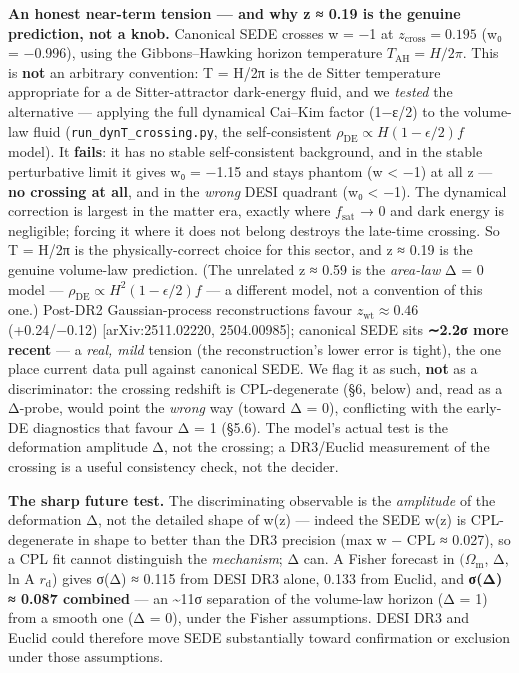 \documentclass[
  10pt,
]{article}
\begin{document}
\textbf{An honest near-term tension --- and why z ≈ 0.19 is the genuine
prediction, not a knob.} Canonical SEDE crosses w = −1 at
\textbf{\(z_{\mathrm{cross}} = 0.195\)} (w₀ = −0.996), using the
Gibbons--Hawking horizon temperature \(T_{\mathrm{AH}} = H/2\pi\). This
is \textbf{not} an arbitrary convention: T = H/2π is the de Sitter
temperature appropriate for a de Sitter-attractor dark-energy fluid, and
we \emph{tested} the alternative --- applying the full dynamical
Cai--Kim factor (1−ε/2) to the volume-law fluid
(\texttt{run\_dynT\_crossing.py}, the self-consistent
\(\rho _{\mathrm{DE}} \propto  H(1-\epsilon /2)f\) model). It
\textbf{fails}: it has no stable self-consistent background, and in the
stable perturbative limit it gives w₀ = −1.15 and stays phantom (w
\textless{} −1) at all z --- \textbf{no crossing at all}, and in the
\emph{wrong} DESI quadrant (w₀ \textless{} −1). The dynamical correction
is largest in the matter era, exactly where \(f_{\mathrm{sat}}\) → 0 and
dark energy is negligible; forcing it where it does not belong destroys
the late-time crossing. So T = H/2π is the physically-correct choice for
this sector, and z ≈ 0.19 is the genuine volume-law prediction. (The
unrelated z ≈ 0.59 is the \emph{area-law} Δ = 0 model ---
\(\rho _{\mathrm{DE}} \propto  H^{2}(1-\epsilon /2)f\) --- a different
model, not a convention of this one.) Post-DR2 Gaussian-process
reconstructions favour \(z_{\mathrm{wt}} \approx  0.46\) (+0.24/−0.12)
{[}arXiv:2511.02220, 2504.00985{]}; canonical SEDE sits \textbf{∼2.2σ
more recent} --- a \emph{real, mild} tension (the reconstruction's lower
error is tight), the one place current data pull against canonical SEDE.
We flag it as such, \textbf{not} as a discriminator: the crossing
redshift is CPL-degenerate (§6, below) and, read as a Δ-probe, would
point the \emph{wrong} way (toward Δ = 0), conflicting with the early-DE
diagnostics that favour Δ = 1 (§5.6). The model's actual test is the
deformation amplitude Δ, not the crossing; a DR3/Euclid measurement of
the crossing is a useful consistency check, not the decider.

\textbf{The sharp future test.} The discriminating observable is the
\emph{amplitude} of the deformation Δ, not the detailed shape of w(z)
--- indeed the SEDE w(z) is CPL-degenerate in shape to better than the
DR3 precision (max \textbar w − CPL\textbar{} ≈ 0.027), so a CPL fit
cannot distinguish the \emph{mechanism}; Δ can. A Fisher forecast in
\((\Omega _{\mathrm{m}}\), Δ, ln A \(r_{\mathrm{d}}\)) gives σ(Δ) ≈
0.115 from DESI DR3 alone, 0.133 from Euclid, and \textbf{σ(Δ) ≈ 0.087
combined} --- an \textasciitilde11σ separation of the volume-law horizon
(Δ = 1) from a smooth one (Δ = 0), under the Fisher assumptions. DESI
DR3 and Euclid could therefore move SEDE substantially toward
confirmation or exclusion under those assumptions.
\end{document}
